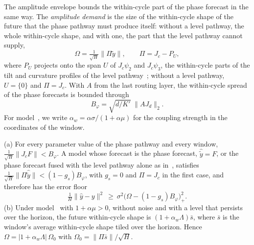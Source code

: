 {The amplitude envelope bounds the within-cycle part of the phase forecast in the same way. The \emph{amplitude demand} is the size of the within-cycle shape of the future that the phase pathway must produce itself: without a level pathway, the whole within-cycle shape, and with one, the part that the level pathway cannot supply,
\begin{equation}
\Omega=\tfrac{1}{\sqrt H}\|\Pi\tilde y\|,\qquad \Pi=J_c-P_U,
\label{eq:amplitude_demand}
\end{equation}
where $P_U$ projects onto the span $U$ of $J_c\psi_2$ and $J_c\psi_3$, the within-cycle parts of the tilt and curvature profiles of the level pathway~; without a level pathway, $U=\{0\}$ and $\Pi=J_c$. With $A$ from the last routing layer, the within-cycle spread of the phase forecasts is bounded through
\begin{equation}
B_\varphi=\sqrt{d/K'}\;\|AJ_d\|_2 .
\label{eq:amplitude_constant}
\end{equation}
For model~, we write $\alpha_w=\alpha\sigma/(1+\alpha\mu)$ for the coupling strength in the coordinates of the window.

\begin{theorem}
\label{thm:amplitude}
(a) For every parameter value of the phase pathway and every window, $\tfrac1{\sqrt H}\|J_cF\|<B_\varphi$. A model whose forecast is the phase forecast, $\hat{\tilde y}=F$, or the phase forecast fused with the level pathway alone as in~, satisfies $\tfrac1{\sqrt H}\|\Pi\hat{\tilde y}\|<(1-g_s)B_\varphi$, with $g_s=0$ and $\Pi=J_c$ in the first case, and therefore has the error floor
\begin{equation}
\tfrac1H\|\hat y-y\|^2\ \ge\ \sigma^2\big(\Omega-(1-g_s)B_\varphi\big)_+^2 .
\label{eq:amplitude_floor}
\end{equation}
(b) Under model~ with $1+\alpha\mu>0$, without noise and with a level that persists over the horizon, the future within-cycle shape is $(1+\alpha_w\Lambda)\bar s$, where $\bar s$ is the window's average within-cycle shape tiled over the horizon. Hence $\Omega=|1+\alpha_w\Lambda|\,\Omega_0$ with $\Omega_0=\|\Pi\bar s\|/\sqrt H$.
\end{theorem}

}
